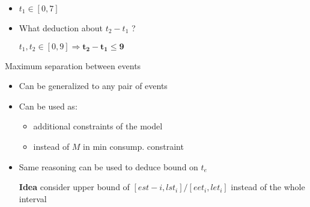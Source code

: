 \begin{frame}
\begin{itemize}
\begin{center}
    \end{center}
    {\color{gray!60!black!70} \small $2$ tasks $\Rightarrow 4$ events:
      $t_1,\ t_2,\ t_3$ and $t_4$}
  \item<2-> $t_1 \in [0,7]$ 
    \vfill
  \item<4-> What deduction about $t_2 - t_1$ ?
    
    $t_1,t_2 \in [0,9] \Rightarrow \mathbf{t_2-t_1 \le 9}$
    
  \end{itemize}
  
\end{frame}


\begin{frame}{Maximum separation between events}
  \vfill
  \begin{itemize}
  \item Can be generalized to any pair of events
    \vfill
  \item Can be used as:
    \begin{itemize}
      \vspace{0.2cm}
    \item additional constraints of the model
    \item instead of $M$ in min consump. constraint
    \end{itemize}  
    \vfill
  \item Same reasoning can be used to deduce bound on $t_e$

    {\small \color{gray!60!black!70} {\bf Idea} consider upper bound
      of $[est-i,lst_i]/[eet_i,let_i]$ instead of the whole interval}
    \vfill
  \end{itemize}
\end{frame}


